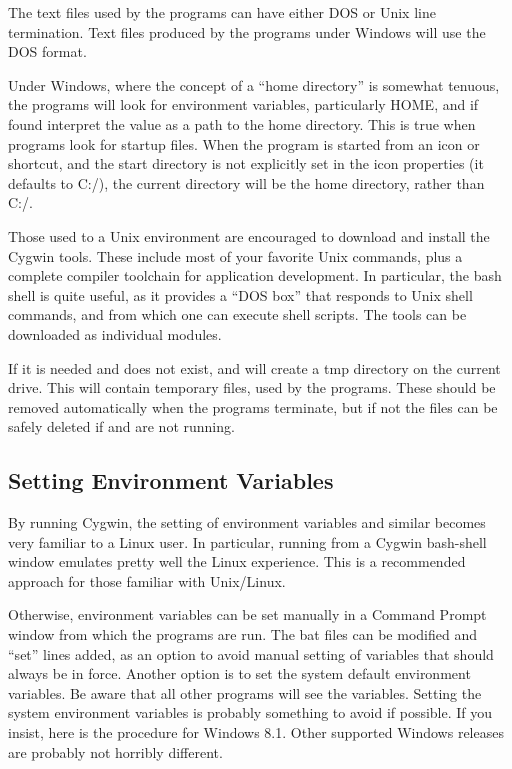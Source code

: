 The text files used by the programs can have either DOS or Unix line
termination.  Text files produced by the programs under Windows will
use the DOS format.

Under Windows, where the concept of a ``home directory'' is somewhat
tenuous, the programs will look for environment variables,
particularly {\et HOME}, and if found interpret the value as a path to
the home directory.  This is true when programs look for startup
files.  When the program is started from an icon or shortcut, and the
start directory is not explicitly set in the icon properties (it
defaults to {\vt C:/}), the current directory will be the home
directory, rather than {\vt C:/}.

Those used to a Unix environment are encouraged to download and
install the Cygwin tools.  These include most of your favorite Unix
commands, plus a complete compiler toolchain for application
development.  In particular, the bash shell is quite useful, as it
provides a ``DOS box'' that responds to Unix shell commands, and from
which one can execute shell scripts.  The tools can be downloaded as
individual modules.

If it is needed and does not exist, {\Xic} and {\WRspice} will create
a {\vt {$\backslash$}tmp} directory on the current drive.  This will
contain temporary files, used by the programs.  These should be
removed automatically when the programs terminate, but if not the
files can be safely deleted if {\Xic} and {\WRspice} are not running.

\subsection{Setting Environment Variables}

By running Cygwin, the setting of environment variables and similar
becomes very familiar to a Linux user.  In particular, running {\Xic}
from a Cygwin bash-shell window emulates pretty well the Linux
experience.  This is a recommended approach for those familiar with
Unix/Linux.

Otherwise, environment variables can be set manually in a {\cb Command
Prompt} window from which the programs are run.  The {\vt bat} files
can be modified and ``{\vt set}'' lines added, as an option to avoid
manual setting of variables that should always be in force.  Another
option is to set the system default environment variables.  Be aware
that all other programs will see the variables.  Setting the system
environment variables is probably something to avoid if possible.  If
you insist, here is the procedure for Windows 8.1.  Other supported
Windows releases are probably not horribly different.

